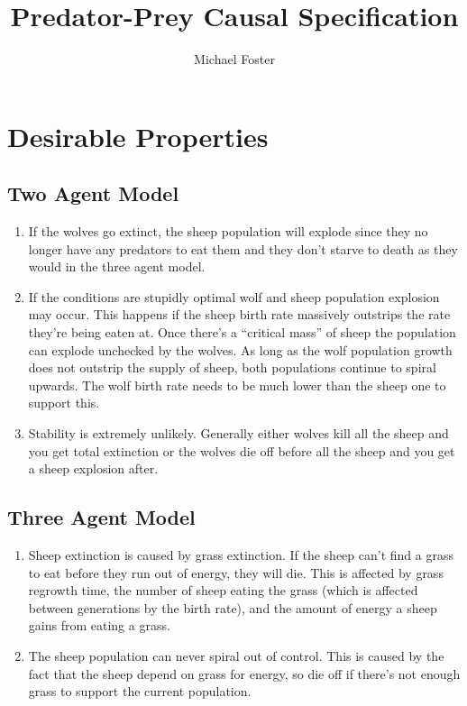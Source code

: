 \documentclass{article}
\title{Predator-Prey Causal Specification}
\author{Michael Foster}
\begin{document}
\maketitle

\section{Desirable Properties}

\subsection{Two Agent Model}
\begin{enumerate}
  \item If the wolves go extinct, the sheep population will explode since they no longer have any predators to eat them and they don't starve to death as they would in the three agent model.
  \item If the conditions are stupidly optimal wolf and sheep population explosion may occur. This happens if the sheep birth rate massively outstrips the rate they're being eaten at. Once there's a ``critical mass'' of sheep the population can explode unchecked by the wolves. As long as the wolf population growth does not outstrip the supply of sheep, both populations continue to spiral upwards. The wolf birth rate needs to be much lower than the sheep one to support this.
  \item Stability is extremely unlikely. Generally either wolves kill all the sheep and you get total extinction or the wolves die off before all the sheep and you get a sheep explosion after.
\end{enumerate}

\subsection{Three Agent Model}
\begin{enumerate}
  \item Sheep extinction is caused by grass extinction. If the sheep can't find a grass to eat before they run out of energy, they will die. This is affected by grass regrowth time, the number of sheep eating the grass (which is affected between generations by the birth rate), and the amount of energy a sheep gains from eating a grass.
  \item The sheep population can never spiral out of control. This is caused by the fact that the sheep depend on grass for energy, so die off if there's not enough grass to support the current population.
\end{enumerate}
\end{document}
